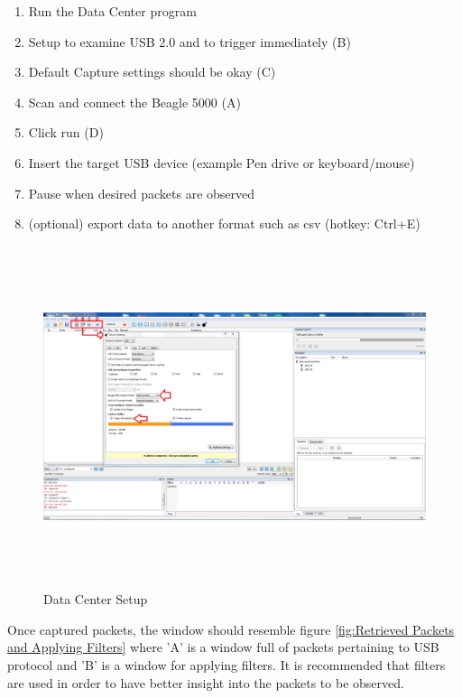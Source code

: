 \documentclass[10pt,a4paper]{article}
\begin{document}
\begin{enumerate}
	\item Run the Data Center program
	\item Setup to examine USB 2.0 and to trigger immediately (B)
	\item Default Capture settings should be okay (C)
	\item Scan and connect the Beagle 5000 (A)
	\item Click run (D)
	\item Insert the target USB device (example Pen drive or keyboard/mouse)
	\item Pause when desired packets are observed
	\item (optional) export data to another format such as csv (hotkey: Ctrl+E)
\end{enumerate}

\begin{figure}[h]
	\includegraphics[width=12cm,height=10cm]{Data_Center.PNG}
	\caption{Data Center Setup}
	\label{fig:Data Center Setup}
\end{figure}

Once captured packets, the window should resemble figure \ref{fig:Retrieved Packets and Applying Filters} where 'A' is a window full of packets pertaining to USB protocol and 'B' is a window for applying filters. It is recommended that filters are used in order to have better insight into the packets to be observed.
\end{document}
